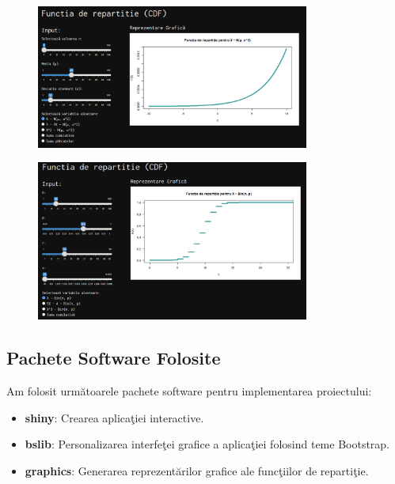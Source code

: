 \documentclass[a4paper,11pt]{article}
\begin{document}
\begin{figure}[h!]
  \centering
  \includegraphics[width=0.8\textwidth]{./img/4.png}
  \label{fig:imaginea_ta_3}
\end{figure}

\begin{figure}[h!]
  \centering
  \includegraphics[width=0.8\textwidth]{./img/5.png}
  \label{fig:imaginea_ta_3}
\end{figure}

\subsection*{Pachete Software Folosite}

Am folosit urm\u{a}toarele pachete software pentru implementarea proiectului:

\begin{itemize}
    \item \textbf{shiny}: Crearea aplica\c{t}iei interactive.
    \item \textbf{bslib}: Personalizarea interfe\c{t}ei grafice a aplica\c{t}iei folosind teme Bootstrap.
    \item \textbf{graphics}: Generarea reprezent\u{a}rilor grafice ale func\c{t}iilor de reparti\c{t}ie.
\end{itemize}
\end{document}
